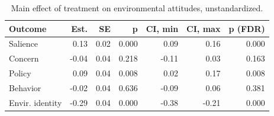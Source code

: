 \begin{table}[h!t]
\centering
\begin{tabular}{lrrrrrr}
  \hline
Outcome & Est. & SE & p & CI, min & CI, max & p (FDR) \\ 
  \hline
Salience & 0.13 & 0.02 & 0.000 & 0.09 & 0.16 & 0.000 \\ 
  Concern & -0.04 & 0.04 & 0.218 & -0.11 & 0.03 & 0.163 \\ 
  Policy & 0.09 & 0.04 & 0.008 & 0.02 & 0.17 & 0.008 \\ 
  Behavior & -0.02 & 0.04 & 0.636 & -0.09 & 0.06 & 0.381 \\ 
  Envir. identity & -0.29 & 0.04 & 0.000 & -0.38 & -0.21 & 0.000 \\ 
   \hline
\end{tabular}
\caption{Main effect of treatment on environmental attitudes, unstandardized.} 
\label{tab:main_unstand}
\end{table}
